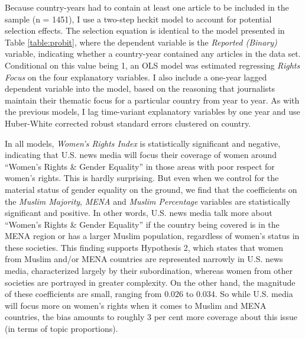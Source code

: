 \documentclass[11pt, oneside]{article}
\begin{document}
Because country-years had to contain at least one article to be included in the sample (n = 1451), I use a two-step heckit model to account for potential selection effects. The selection equation is identical to the model presented in Table \ref{table:probit}, where the dependent variable is the \emph{Reported (Binary)} variable, indicating whether a country-year contained any articles in the data set. Conditional on this value being 1, an OLS model was estimated regressing \emph{Rights Focus} on the four explanatory variables. I also include a one-year lagged dependent variable into the model, based on the reasoning that journalists maintain their thematic focus for a particular country from year to year. As with the previous models, I lag time-variant explanatory variables by one year and use Huber-White corrected robust standard errors clustered on country.



In all models, \emph{Women's Rights Index} is statistically significant and negative, indicating that U.S. news media will focus their coverage of women around ``Women's Rights \& Gender Equality'' in those areas with poor respect for women's rights. This is hardly surprising. But even when we control for the material status of gender equality on the ground, we find that the coefficients on the \emph{Muslim Majority}, \emph{MENA} and \emph{Muslim Percentage} variables are statistically significant and positive. In other words, U.S. news media talk more about ``Women's Rights \& Gender Equality'' if the country being covered is in the MENA region or has a larger Muslim population, regardless of women's status in these societies. This finding supports Hypothesis 2, which states that women from Muslim and/or MENA countries are represented narrowly in U.S. news media, characterized largely by their subordination, whereas women from other societies are portrayed in greater complexity. On the other hand, the magnitude of these coefficients are small, ranging from $0.026$ to $0.034$. So while U.S. media will focus more on women's rights when it comes to Muslim and MENA countries, the bias amounts to roughly 3 per cent more coverage about this issue (in terms of topic proportions).
\end{document}
